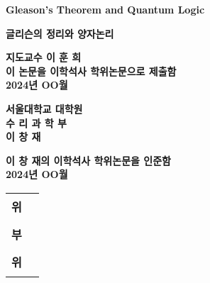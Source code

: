 \begin{titlepage}
    \begin{center}
        
        \LARGE
        \textbf{Gleason's Theorem and Quantum Logic}
        
        \vspace{1.0cm}
        \LARGE
        \textbf{글리슨의 정리와 양자논리}
        
        \vspace{1.0cm}
        \Large
        \textbf{지도교수 이 훈 희}\\
        \vspace{1.0cm}
        \textbf{이 논문을 이학석사 학위논문으로 제출함}\\
        \textbf{2024년 OO월}
        \vspace{1.0cm}

        \textbf{서울대학교 대학원}\\
        \textbf{수 리 과 학 부}\\
        \textbf{이 창 재}

        \vspace{1.0cm}
        \textbf{이 창 재의 이학석사 학위논문을 인준함}\\
        \textbf{2024년 OO월}
        
        \vfill
     
        \begin{tabular}{cc}
        \textbf{위} & \rule{5.0cm}{1.0pt} \\
        \textbf{부} & \rule{5.0cm}{1.0pt}\\
        \textbf{위} & \rule{5.0cm}{1.0pt}\\
        \end{tabular}
        
    \end{center}
\end{titlepage}